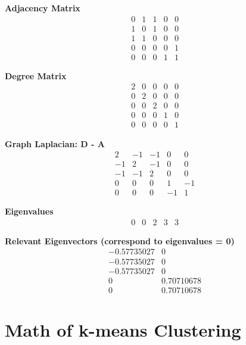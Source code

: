 \documentclass{article}
\begin{document}
\begin{enumerate}
\textbf{Adjacency Matrix}
\[
\begin{matrix}
0 & 1 & 1 & 0 & 0 \\
1 & 0 & 1 & 0 & 0 \\
1 & 1 & 0 & 0 & 0 \\
0 & 0 & 0 & 0 & 1 \\
0 & 0 & 0 & 1 & 1
\end{matrix}
\]

\textbf{Degree Matrix}
\[
\begin{matrix}
2 & 0 & 0 & 0 & 0 \\
0 & 2 & 0 & 0 & 0 \\
0 & 0 & 2 & 0 & 0 \\
0 & 0 & 0 & 1 & 0 \\
0 & 0 & 0 & 0 & 1
\end{matrix}
\]

\textbf{Graph Laplacian: D - A}
\[
\begin{matrix}
2 & -1 & -1 & 0 & 0 \\
-1 & 2 & -1 & 0 & 0 \\
-1 & -1 & 2 & 0 & 0 \\
0 & 0 & 0 & 1 & -1 \\
0 & 0 & 0 & -1 & 1
\end{matrix}
\]

\textbf{Eigenvalues}
\[
\begin{matrix}
0 & 0 & 2 & 3 & 3
\end{matrix}
\]

\textbf{Relevant Eigenvectors (correspond to eigenvalues = 0)}
\[
\begin{matrix}
-0.57735027 & 0  \\
-0.57735027 & 0  \\
-0.57735027 & 0  \\
0 & 0.70710678  \\
0 & 0.70710678
\end{matrix}
\]
\end{enumerate}

\section{Math of k-means Clustering}
\end{document}
